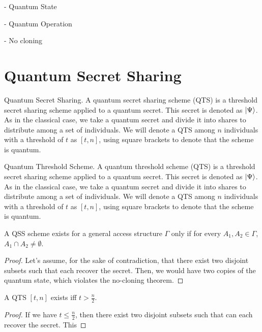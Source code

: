 - Quantum State

- Quantum Operation

- No cloning

\section{Quantum Secret Sharing}

\theoremstyle{definition}
\begin{definition}{Quantum Secret Sharing.}
    A quantum secret sharing scheme (QTS) is a threshold secret sharing scheme applied to a quantum secret. This secret is denoted as $\ket{\Psi}$. As in the classical case, we take a quantum secret and divide it into shares to distribute among a set of individuals. We will denote a QTS among $n$ individuals with a threshold of $t$ as $[t,n]$, using square brackets to denote that the scheme is quantum.
\end{definition}

\theoremstyle{definition}
\begin{definition}{Quantum Threshold Scheme.}
    A quantum threshold scheme (QTS) is a threshold secret sharing scheme applied to a quantum secret. This secret is denoted as $\ket{\Psi}$. As in the classical case, we take a quantum secret and divide it into shares to distribute among a set of individuals. We will denote a QTS among $n$ individuals with a threshold of $t$ as $[t,n]$, using square brackets to denote that the scheme is quantum.
\end{definition}

\theoremstyle{theorem}
\begin{theorem}
\label{qss2}
    A QSS scheme exists for a general access structure $\Gamma$ only if for every $A_1, A_2 \in \Gamma$, $A_1 \cap A_2 \neq \emptyset$.
\end{theorem}

\begin{proof}
    Let's assume, for the sake of contradiction, that there exist two disjoint subsets such that each recover the secret. Then, we would have two copies of the quantum state, which violates the no-cloning theorem. 
\end{proof}

\theoremstyle{theorem}
\begin{theorem}
    A QTS $[t,n]$ exists iff $t > \frac{n}{2}$.
\end{theorem}

\begin{proof}
    If we have $t \leq \frac{n}{2}$, then there exist two disjoint subsets such that can each recover the secret. This 
\end{proof}

